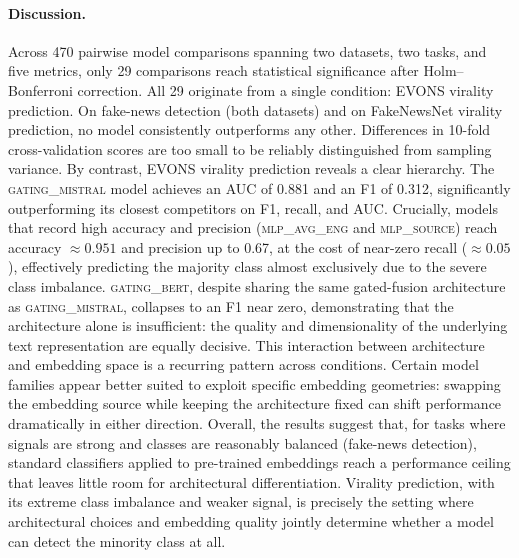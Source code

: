 
\paragraph{Discussion.}
Across 470 pairwise model comparisons spanning two datasets, two tasks, and five metrics, only 29 comparisons reach statistical significance after Holm--Bonferroni correction. All 29 originate from a single condition: EVONS virality prediction. On fake-news detection (both datasets) and on FakeNewsNet virality prediction, no model consistently outperforms any other. Differences in 10-fold cross-validation scores are too small to be reliably distinguished from sampling variance. By contrast, EVONS virality prediction reveals a clear hierarchy. The \textsc{gating\_mistral} model achieves an AUC of 0.881 and an F1 of 0.312, significantly outperforming its closest competitors on F1, recall, and AUC. Crucially, models that record high accuracy and precision (\textsc{mlp\_avg\_eng} and \textsc{mlp\_source}) reach accuracy $\approx 0.951$ and precision up to 0.67, at the cost of near-zero recall ($\approx 0.05$), effectively predicting the majority class almost exclusively due to the severe class imbalance. \textsc{gating\_bert}, despite sharing the same gated-fusion architecture as \textsc{gating\_mistral}, collapses to an F1 near zero, demonstrating that the architecture alone is insufficient: the quality and dimensionality of the underlying text representation are equally decisive. This interaction between architecture and embedding space is a recurring pattern across conditions. Certain model families appear better suited to exploit specific embedding geometries: swapping the embedding source while keeping the architecture fixed can shift performance dramatically in either direction. Overall, the results suggest that, for tasks where signals are strong and classes are reasonably balanced (fake-news detection), standard classifiers applied to pre-trained embeddings reach a performance ceiling that leaves little room for architectural differentiation. Virality prediction, with its extreme class imbalance and weaker signal, is precisely the setting where architectural choices and embedding quality jointly determine whether a model can detect the minority class at all.